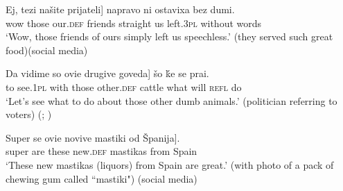 \documentclass[output=paper]{langscibook}
\begin{document}
\ex \label{speechless}
\gll Ej, 	\minsp{[} tezi 	našite	prijateli] 	napravo 	ni 	ostavixa 	bez 	dumi.\\
wow 	{} those 	our.\textsc{def} friends straight 	us 	left.\textsc{3pl} 	without 	words\\
\glt `Wow, those friends of ours simply left us speechless.' (they served such great food)\hfill (social media)
\z
\z





\ea \label{Mmedia}
\ea \label{cattle}
\gll Da 	vidime 	so 	\minsp{[} ovie 	drugive 	goveda] 	šo 	ḱe	se 	prai.\\
    to 	see.\textsc{1pl} 	with 	 {} those 	other.\textsc{def}	cattle 	what 	will 	\textsc{refl} 	do\\
    \glt ‘Let’s see what to do about those other dumb animals.’ (politician referring to voters) \hfill (; \citealt{Prizma2015})

    \ex \label{mastika}
    \gll Super 	se 	\minsp{[} ovie 	novive 	mastiki 	od 	Španija].\\
    super 	are 	 {} these 	new.\textsc{def} 	mastikas 	from 	Spain\\
    \glt ‘These new mastikas (liquors) from Spain are great.’ (with photo of a pack of chewing gum called ``mastiki") \hfill (social media)
    \z
    \z
\end{document}
